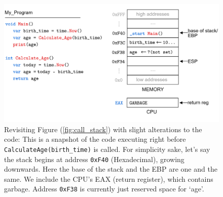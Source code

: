 \begin{figure}[!ht]
    \centering
    \includegraphics[width=\textwidth]{./Sections/stacks_heaps/call_stack_precise.png}
    \caption{Revisiting Figure (\ref{fig:call_stack}) with slight alterations to the code: This is a snapshot of the code executing right before \texttt{CalculateAge(birth\_time)} is called. For simplicity sake,
    let's say the stack begins at address \texttt{0xF40} (Hexadecimal), growing downwards. Here the base of the stack and the EBP are one and the same.
    We include the CPU's EAX (return register), which contains garbage. Address \texttt{0xF38} is currently just reserved space for `age'.}

\label{fig:call_stack_precise}
\end{figure}

\newpage 

